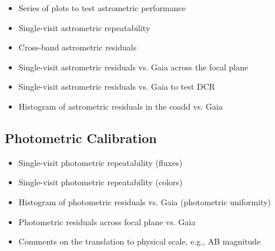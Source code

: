 \begin{itemize}

\item Series of plots to test astrometric performance

\item Single-visit astrometric repeatability

\item Cross-band astrometric residuals

\item Single-visit astrometric residuals vs. Gaia across the focal plane

\item Single-visit astrometric residuals vs. Gaia to test DCR

\item Histogram of astrometric residuals in the coadd vs. Gaia

\end{itemize}



\subsection{Photometric Calibration}

\begin{itemize}

\item Single-visit photometric repeatability (fluxes)

\item Single-visit photometric repeatability (colors)

\item Histogram of photometric residuals vs. Gaia (photometric uniformity)

\item Photometric residuals across focal plane vs. Gaia

\item Comments on the translation to physical scale, e.g., AB magnitude 

\end{itemize}


